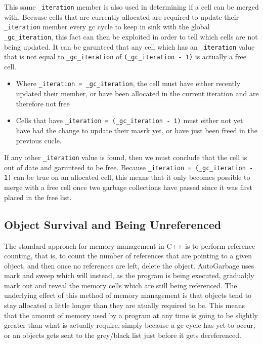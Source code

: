 \documentclass[11pt]{article}
\begin{document}
\begin{enumerate}
This same \texttt{\_iteration} member is also used in determining if a cell can be merged with. Because cells that are currently 
allocated are required to update their \texttt{\_iteration} member every gc cycle to keep in sink with the global
\texttt{\_gc\_iteration}, this fact can then be exploited in order to tell which cells are not being updated. It can
be garunteed that any cell which has an \texttt{\_iteration} value that is not equal to \texttt{\_gc\_iteration}
of \texttt{(\_gc\_iteration - 1)} is actually a free cell.
\begin{itemize}
\item Where \texttt{\_iteration = \_gc\_iteration}, the cell must have either recently updated their member, or have
been allocated in the current iteration and are therefore not free
\item Cells that have \texttt{\_iteration = (\_gc\_iteration - 1)} must either not yet have had the change to update their masrk
yet, or have just been freed in the previous cucle.
\end{itemize}

If any other \texttt{\_iteration} value is found, then we must conclude that the cell is out of date and garunteed to be free.
Because \texttt{\_iteration = (\_gc\_iteration - 1)} can be true on an allocated cell, this means that it only becomes possible
to merge with a free cell once two garbage collections have passed since it was first placed in the free list.
\end{enumerate}

\subsection{Object Survival and Being Unreferenced}
The standard approach for memory management in C++ is to perform reference counting, that is, to count the number of 
references that are pointing to a given object, and then once no references are left, delete the object. AutoGarbage uses
mark and sweep which will instead, as the program is being executed, gradual;ly mark out and reveal the memory cells which are still
being referenced.
The underlying effect of this method of memory management is that objects tend to stay allocated a little longer than they 
are atually required to be. This means that the amount of memory used by a program at any time is going to be slightly greater
than what is actually require, simply because a gc cycle has yet to occur, or an objects gets sent to the grey/black list 
just before it gets dereferenced.
\end{document}

